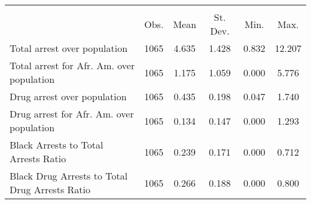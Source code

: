 {
\def\sym#1{\ifmmode^{#1}\else\(^{#1}\)\fi}
\begin{tabular}{l*{1}{ccccc}}
\hline\hline
                    &\multicolumn{5}{c}{}                                            \\
                    &        Obs.&        Mean&    St. Dev.&        Min.&        Max.\\
\hline
Total arrest over population&        1065&       4.635&       1.428&       0.832&      12.207\\
Total arrest for Afr. Am. over population&        1065&       1.175&       1.059&       0.000&       5.776\\
Drug arrest over population&        1065&       0.435&       0.198&       0.047&       1.740\\
Drug arrest for Afr. Am. over population&        1065&       0.134&       0.147&       0.000&       1.293\\
Black Arrests to Total Arrests Ratio&        1065&       0.239&       0.171&       0.000&       0.712\\
Black Drug Arrests to Total Drug Arrests Ratio&        1065&       0.266&       0.188&       0.000&       0.800\\
\hline\hline
\end{tabular}
}
